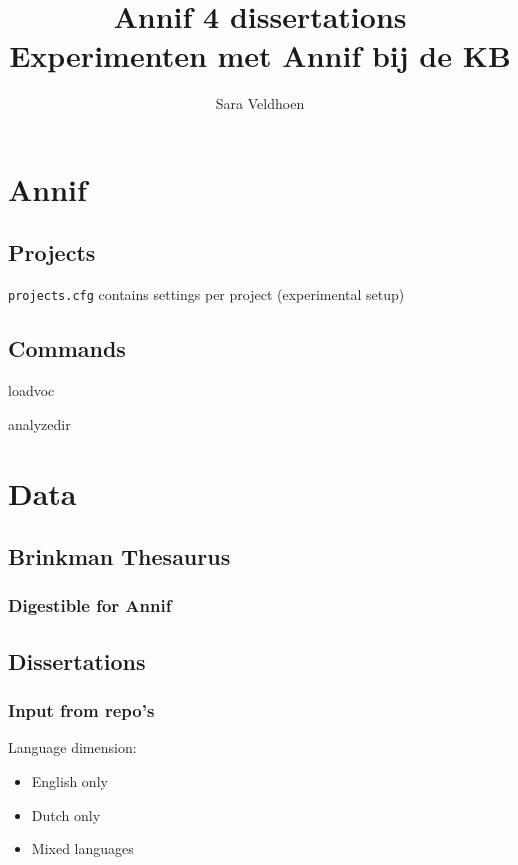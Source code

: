 \documentclass{article}
\title{Annif 4 dissertations\\Experimenten met Annif bij de KB}
\author{Sara Veldhoen}
\begin{document}
\maketitle

\tableofcontents

\clearpage

\section{Annif}

\subsection{Projects}

{\tt projects.cfg} contains settings per project (experimental setup)

\subsection{Commands}

loadvoc

analyzedir



\section{Data}


\subsection{Brinkman Thesaurus}
\subsubsection{Digestible for Annif}

\subsection{Dissertations}

\subsubsection{Input from repo's}

Language dimension:\begin{itemize}
\item English only
\item Dutch only
\item Mixed languages
\end{itemize}
\end{document}
